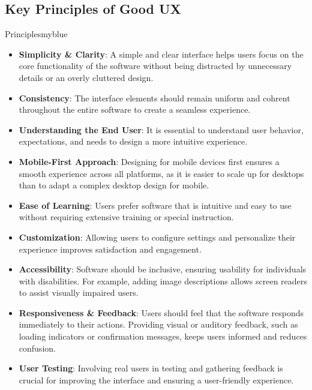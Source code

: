 \subsection{Key Principles of Good UX}
\begin{prettyBox}{Principles}{myblue}
\begin{itemize}
\item \textbf{Simplicity \& Clarity}: A simple and clear interface helps users 
focus on the core functionality of the software without being distracted by 
unnecessary details or an overly cluttered design.
\item \textbf{Consistency}: The interface elements should remain uniform 
and cohrent throughout the entire software to create a seamless experience.
\item \textbf{Understanding the End User}: It is essential to understand user 
behavior, expectations, and needs to design a more intuitive experience.
\item \textbf{Mobile-First Approach}: Designing for mobile devices first 
ensures a smooth experience across all platforms, as it is easier to scale up 
for desktops than to adapt a complex desktop design for mobile.
\item \textbf{Ease of Learning}: Users prefer software that is intuitive and 
easy to use without requiring extensive training or special instruction.
\item \textbf{Customization}: Allowing users to configure settings and 
personalize their experience improves satisfaction and engagement.
\item \textbf{Accessibility}: Software should be inclusive, ensuring usability 
for individuals with disabilities. For example, adding image descriptions 
allows screen readers to assist visually impaired users.
\item \textbf{Responsiveness \& Feedback}: Users should feel that the 
software responds immediately to their actions. Providing visual or auditory 
feedback, such as loading indicators or confirmation messages, keeps users 
informed and reduces confusion.
\item \textbf{User Testing}: Involving real users in testing and gathering 
feedback is crucial for improving the interface and ensuring a 
user-friendly experience.
\end{itemize}
\end{prettyBox}

